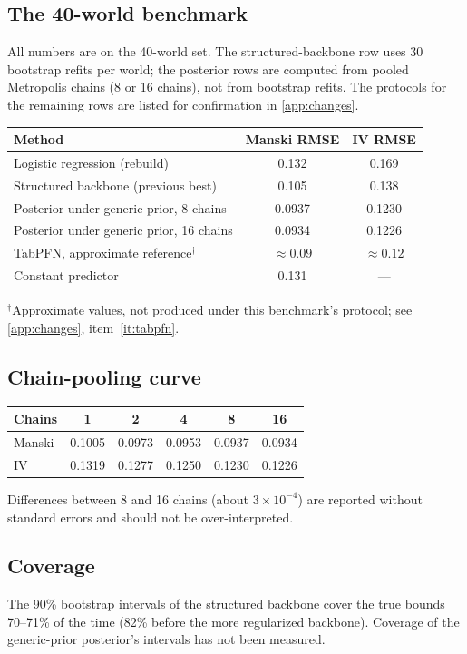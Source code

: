 \documentclass[11pt]{article}
\theoremstyle{definition}
\theoremstyle{remark}
\begin{document}
\subsection{The 40-world benchmark}
All numbers are on the 40-world set. The structured-backbone row uses 30 bootstrap refits per
world; the posterior rows are computed from pooled Metropolis chains (8 or 16 chains), not from
bootstrap refits. The protocols for the remaining rows are listed for confirmation in
\cref{app:changes}.

\begin{center}
\begin{tabular}{@{}lcc@{}}
\toprule
Method & Manski RMSE & IV RMSE\\
\midrule
Logistic regression (rebuild) & 0.132 & 0.169\\
Structured backbone (previous best) & 0.105 & 0.138\\
Posterior under generic prior, 8 chains & 0.0937 & 0.1230\\
Posterior under generic prior, 16 chains & 0.0934 & 0.1226\\
TabPFN, approximate reference$^{\dagger}$ & $\approx0.09$ & $\approx0.12$\\
Constant predictor & 0.131 & ---\\
\bottomrule
\end{tabular}
\end{center}
{\small $^\dagger$Approximate values, not produced under this benchmark's protocol; see
\cref{app:changes}, item~\ref{it:tabpfn}.}

\subsection{Chain-pooling curve}
\begin{center}
\begin{tabular}{@{}lccccc@{}}
\toprule
Chains & 1 & 2 & 4 & 8 & 16\\
\midrule
Manski & 0.1005 & 0.0973 & 0.0953 & 0.0937 & 0.0934\\
IV & 0.1319 & 0.1277 & 0.1250 & 0.1230 & 0.1226\\
\bottomrule
\end{tabular}
\end{center}
Differences between 8 and 16 chains (about $3\times10^{-4}$) are reported without standard errors and
should not be over-interpreted.

\subsection{Coverage}
The 90\% bootstrap intervals of the structured backbone cover the true bounds 70--71\% of the time
(82\% before the more regularized backbone). Coverage of the generic-prior posterior's intervals has
not been measured.
\end{document}
